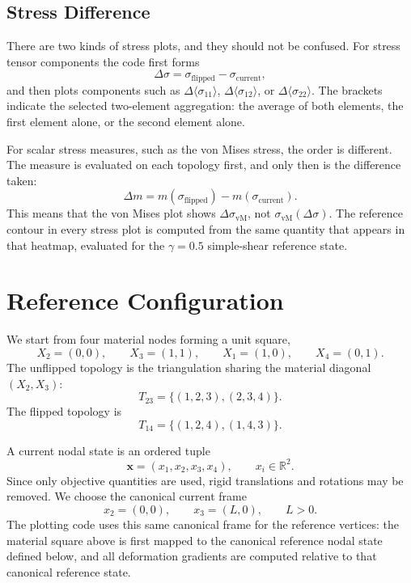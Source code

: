 \documentclass[11pt]{article}
\begin{document}
\subsection{Stress Difference}

There are two kinds of stress plots, and they should not be confused. For
stress tensor components the code first forms
\[
    \Delta \sigma
      =
      \sigma_{\mathrm{flipped}}-\sigma_{\mathrm{current}},
\]
and then plots components such as \(\Delta\langle\sigma_{11}\rangle\),
\(\Delta\langle\sigma_{12}\rangle\), or
\(\Delta\langle\sigma_{22}\rangle\). The brackets indicate the selected
two-element aggregation: the average of both elements, the first element
alone, or the second element alone.

For scalar stress measures, such as the von Mises stress, the order is
different. The measure is evaluated on each topology first, and only then is
the difference taken:
\[
    \Delta m
      =
      m(\sigma_{\mathrm{flipped}})
      -
      m(\sigma_{\mathrm{current}}).
\]
This means that the von Mises plot shows \(\Delta\sigma_{\mathrm{vM}}\), not
\(\sigma_{\mathrm{vM}}(\Delta\sigma)\). The reference contour in every stress
plot is computed from the same quantity that appears in that heatmap, evaluated
for the \(\gamma=0.5\) simple-shear reference state.

\section{Reference Configuration}

We start from four material nodes forming a unit square,
\[
    X_2=(0,0), \qquad
    X_3=(1,1), \qquad
    X_1=(1,0), \qquad
    X_4=(0,1).
\]
The unflipped topology is the triangulation sharing the material diagonal
\((X_2,X_3)\):
\[
    T_{23}=\{(1,2,3),(2,3,4)\}.
\]
The flipped topology is
\[
    T_{14}=\{(1,2,4),(1,4,3)\}.
\]

A current nodal state is an ordered tuple
\[
    \mathbf{x}=(x_1,x_2,x_3,x_4),
    \qquad
    x_i\in\mathbb{R}^2.
\]
Since only objective quantities are used, rigid translations and rotations may
be removed. We choose the canonical current frame
\[
    x_2=(0,0),
    \qquad
    x_3=(L,0),
    \qquad
    L>0.
\]
The plotting code uses this same canonical frame for the reference vertices:
the material square above is first mapped to the canonical reference nodal
state defined below, and all deformation gradients are computed relative to
that canonical reference state.
\end{document}
